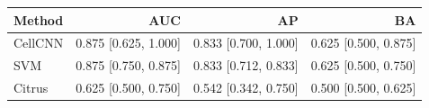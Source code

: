 \begin{tabular}{lrrr}
\toprule
Method & AUC & AP & BA \\
\midrule
CellCNN & 0.875 [0.625, 1.000] & 0.833 [0.700, 1.000] & 0.625 [0.500, 0.875] \\
SVM & 0.875 [0.750, 0.875] & 0.833 [0.712, 0.833] & 0.625 [0.500, 0.750] \\
Citrus & 0.625 [0.500, 0.750] & 0.542 [0.342, 0.750] & 0.500 [0.500, 0.625] \\
\bottomrule
\end{tabular}
